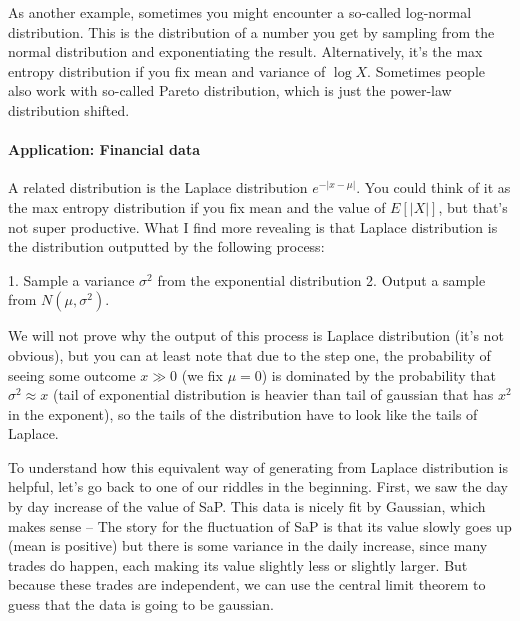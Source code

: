 \documentclass{article}
\begin{document}

As another example, sometimes you might encounter a so-called log-normal distribution. This is the distribution of a number you get by sampling from the normal distribution and exponentiating the result. Alternatively, it's the max entropy distribution if you fix mean and variance of $\log X$. Sometimes people also work with so-called Pareto distribution, which is just the power-law distribution shifted. 

\paragraph{Application: Financial data}
A related distribution is the Laplace distribution $e^{-|x-\mu|}$. You could think of it as the max entropy distribution if you fix mean and the value of $E[|X|]$, but that's not super productive. What I find more revealing is that Laplace distribution is the distribution outputted by the following process:

1. Sample a variance $\sigma^2$ from the exponential distribution
2. Output a sample from $N(\mu, \sigma^2)$. 

We will not prove why the output of this process is Laplace distribution (it's not obvious), but you can at least note that due to the step one, the probability of seeing some outcome $x \gg 0$ (we fix $\mu = 0$) is dominated by the probability that $\sigma^2 \approx x$ (tail of exponential distribution is heavier than tail of gaussian that has $x^2$ in the exponent), so the tails of the distribution have to look like the tails of Laplace. 

To understand how this equivalent way of generating from Laplace distribution is helpful, let's go back to one of our riddles in the beginning. First, we saw the day by day increase of the value of SaP. This data is nicely fit by Gaussian, which makes sense -- The story for the fluctuation of SaP is that its value slowly goes up (mean is positive) but there is some variance in the daily increase, since many trades do happen, each making its value slightly less or slightly larger. But because these trades are independent, we can use the central limit theorem to guess that the data is going to be gaussian. 
\end{document}
